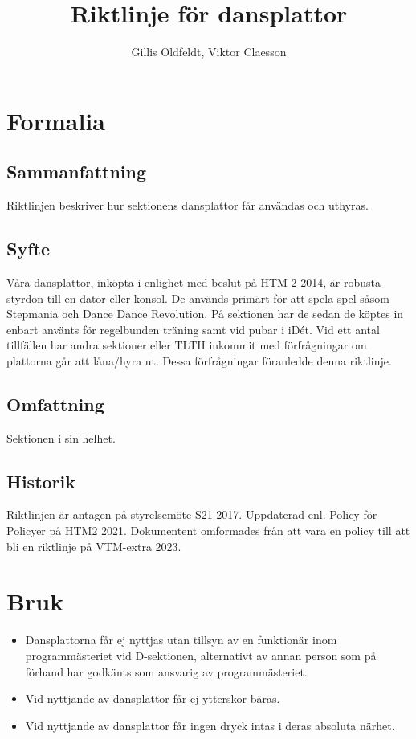 \documentclass{dsekprotokoll}
\title{Riktlinje för dansplattor}
\author{Gillis Oldfeldt, Viktor Claesson}
\begin{document}
\maketitle
\section{Formalia}
\subsection{Sammanfattning}
Riktlinjen beskriver hur sektionens dansplattor får användas och uthyras.
\subsection{Syfte}
Våra dansplattor, inköpta i enlighet med beslut på HTM-2 2014, är robusta styrdon till en dator
eller konsol. De används primärt för att spela spel såsom Stepmania och Dance Dance Revolution. På sektionen har de sedan de köptes in enbart använts för regelbunden träning samt vid
pubar i iDét. Vid ett antal tillfällen har andra sektioner eller TLTH inkommit med förfrågningar
om plattorna går att låna/hyra ut. Dessa förfrågningar föranledde denna riktlinje.

\subsection{Omfattning}
Sektionen i sin helhet.
\subsection{Historik}
Riktlinjen är antagen på styrelsemöte S21 2017.
Uppdaterad enl. Policy för Policyer på HTM2 2021. Dokumentent omformades från att vara en policy till att bli en riktlinje på VTM-extra 2023.

\section{Bruk}
\begin{itemize}
    \item Dansplattorna får ej nyttjas utan tillsyn av en funktionär inom programmästeriet vid D-sektionen, alternativt av annan person som på förhand har godkänts som ansvarig av programmästeriet.
    \item Vid nyttjande av dansplattor får ej ytterskor bäras.
    \item Vid nyttjande av dansplattor får ingen dryck intas i deras absoluta närhet.
\end{itemize}
\end{document}
